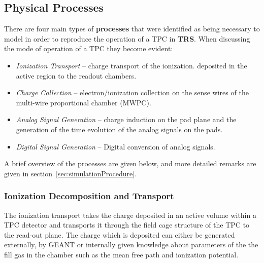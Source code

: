 \documentclass{article}
\begin{document}
\subsection{Physical Processes}
\label{sec:processes}

There are four main types of {\bf processes} that were identified 
as being necessary to model in order to reproduce the operation of 
a TPC in {\bf TRS}.  When discussing the mode of operation of a TPC 
they become evident:
\begin{itemize}
  \item {\em Ionization Transport} -- charge transport of the ionization.
    deposited in the active region to the readout chambers.
  \item {\em Charge Collection} -- electron/ionization collection on the
    sense wires of the multi-wire proportional chamber (MWPC).
  \item {\em Analog Signal Generation} -- charge induction on the pad plane and
    the generation of the time evolution of the analog signals on the pads.
  \item {\em Digital Signal Generation} -- Digital conversion of analog signals.
\end{itemize}
A brief overview of the processes are given below, and more detailed
remarks are given in section~\ref{sec:simulationProcedure}.

\subsubsection{Ionization Decomposition and Transport}
\label{sec:ionizationTransport}

The ionization transport takes the charge deposited in an active volume
within a TPC detector and transports it through the field cage structure of
the TPC to the read-out plane.  The charge which is deposited can either
be generated externally, by GEANT  or internally
given knowledge about parameters of the the fill gas in the chamber such
as the mean free path and ionization potential.
\end{document}
